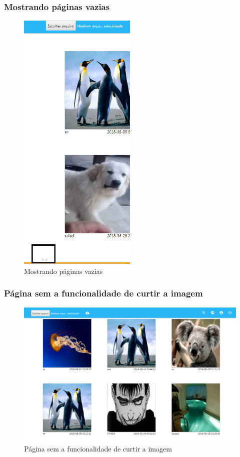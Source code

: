 \subsubsection{Mostrando páginas vazias}
\begin{figure}[ht]
	\centering
	\includegraphics[width=0.5\textwidth]{./imagens/paginas.png}
	\caption{Mostrando páginas vazias}
	\label{fig:casoDeUso}
\end{figure}

\pagebreak

\subsubsection{Página sem a funcionalidade de curtir a imagem}
\begin{figure}[ht]
	\centering
	\includegraphics[width=\textwidth]{./imagens/botao_curtir.png}
	\caption{Página sem a funcionalidade de curtir a imagem}
	\label{fig:casoDeUso}
\end{figure}

